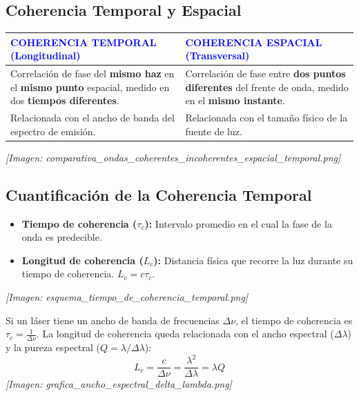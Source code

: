 \documentclass[12pt]{article}
\begin{document}
	\subsection{Coherencia Temporal y Espacial}
	\begin{center}
		\renewcommand{\arraystretch}{1.5}
		\begin{tabular}{|p{}|p{}|}
			\hline
			\textbf{\textcolor{blue}{COHERENCIA TEMPORAL (Longitudinal)}} & \textbf{\textcolor{blue}{COHERENCIA ESPACIAL (Transversal)}} \\
			\hline
			Correlación de fase del \textbf{mismo haz} en el \textbf{mismo punto} espacial, medido en dos \textbf{tiempos diferentes}. & Correlación de fase entre \textbf{dos puntos diferentes} del frente de onda, medido en el \textbf{mismo instante}. \\
			Relacionada con el ancho de banda del espectro de emisión. & Relacionada con el tamaño físico de la fuente de luz. \\
			\hline
		\end{tabular}
	\end{center}
	\textit{[Imagen: comparativa\_ondas\_coherentes\_incoherentes\_espacial\_temporal.png]}
	
	\subsection{Cuantificación de la Coherencia Temporal}
	\begin{itemize}
		\item \textbf{Tiempo de coherencia ($\tau_c$):} Intervalo promedio en el cual la fase de la onda es predecible.
		\item \textbf{Longitud de coherencia ($L_c$):} Distancia física que recorre la luz durante su tiempo de coherencia. $L_c = c \tau_c$.
	\end{itemize}
	\textit{[Imagen: esquema\_tiempo\_de\_coherencia\_temporal.png]}
	
	Si un láser tiene un ancho de banda de frecuencias $\Delta \nu$, el tiempo de coherencia es $\tau_c = \frac{1}{\Delta \nu}$.
	La longitud de coherencia queda relacionada con el ancho espectral ($\Delta \lambda$) y la pureza espectral ($Q = \lambda / \Delta \lambda$):
	\begin{equation*}
		L_c = \frac{c}{\Delta \nu} = \frac{\lambda^2}{\Delta \lambda} = \lambda Q
	\end{equation*}
	\textit{[Imagen: grafica\_ancho\_espectral\_delta\_lambda.png]}
	
\end{document}
